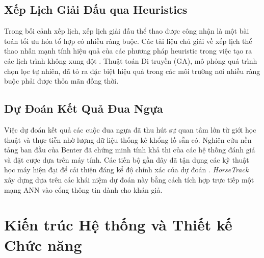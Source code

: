 \documentclass{llncs}
\begin{document}
\subsection{Xếp Lịch Giải Đấu qua Heuristics}
Trong bối cảnh xếp lịch, xếp lịch giải đấu thể thao được công nhận là một bài toán tối ưu hóa tổ hợp có nhiều ràng buộc. Các tài liệu chú giải về xếp lịch thể thao nhấn mạnh tính hiệu quả của các phương pháp heuristic trong việc tạo ra các lịch trình không xung đột \cite{ref_scheduling_bib}. Thuật toán Di truyền (GA), mô phỏng quá trình chọn lọc tự nhiên, đã tỏ ra đặc biệt hiệu quả trong các môi trường nơi nhiều ràng buộc phải được thỏa mãn đồng thời.

\subsection{Dự Đoán Kết Quả Đua Ngựa}
Việc dự đoán kết quả các cuộc đua ngựa đã thu hút sự quan tâm lớn từ giới học thuật và thực tiễn nhờ lượng dữ liệu thống kê khổng lồ sẵn có. Nghiên cứu nền tảng ban đầu của Benter \cite{ref_benter} đã chứng minh tính khả thi của các hệ thống đánh giá và đặt cược dựa trên máy tính. Các tiến bộ gần đây đã tận dụng các kỹ thuật học máy hiện đại để cải thiện đáng kể độ chính xác của dự đoán \cite{ref_doi_1,ref_nyc_blog,ref_pmc_predict}. \textit{HorseTrack} xây dựng dựa trên các khái niệm dự đoán này bằng cách tích hợp trực tiếp một mạng ANN vào cổng thông tin dành cho khán giả.

\section{Kiến trúc Hệ thống và Thiết kế Chức năng}
\end{document}
